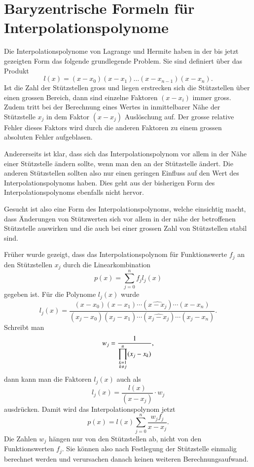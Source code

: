%
%
%
\section{Baryzentrische Formeln für Interpolationspolynome
\label{buch:section:baryzentrisch}}
Die Interpolationspolynome von Lagrange und Hermite haben 
in der bis jetzt gezeigten Form das folgende grundlegende Problem.
Sie sind definiert über das Produkt
\[
l(x)
=
(x-x_0)(x-x_1)\dots (x-x_{n-1})(x-x_n).
\]
Ist die Zahl der Stützstellen gross und liegen erstrecken sich die 
Stützstellen über einen grossen Bereich, dann sind einzelne Faktoren
$(x-x_i)$ immer gross.
Zudem tritt bei der Berechnung eines Wertes in inmittelbarer 
Nähe der Stützstelle $x_j$ in dem Faktor $(x-x_j)$ Auslöschung auf.
Der grosse relative Fehler dieses Faktors wird durch die anderen Faktoren
zu einem grossen absoluten Fehler aufgeblasen.

Andererseits ist klar, dass sich das Interpolationspolynom vor allem
in der Nähe einer Stützstelle ändern sollte, wenn man den an der
Stützstelle ändert.
Die anderen Stützstellen sollten also nur einen geringen Einfluss auf
den Wert des Interpolationspolynoms haben.
Dies geht aus der bisherigen Form des Interpolationspolynoms ebenfalls
nicht hervor.

Gesucht ist also eine Form des Interpolationspolynoms, welche einsichtig
macht, dass Änderungen von Stützwerten sich vor allem in der nähe der
betroffenen Stützstelle auswirken und die auch bei einer grossen Zahl
von Stützstellen stabil sind.

Früher wurde gezeigt, dass das Interpolationspolynom für Funktionswerte
$f_j$ an den Stützstellen $x_j$ durch die Linearkombination
\[
p(x) = \sum_{j=0}^n f_j l_j(x)
\]
gegeben ist.
Für die Polynome $l_j(x)$ wurde
\[
l_j(x)
=
\frac{
(x-x_0)(x-x_1)\cdots(\widehat{x-x_j}) \cdots (x-x_n)
}{
(x_j-x_0)(x_j-x_1)\cdots (\widehat{x_j-x_j})\cdots (x_j-x_n)
}.
\]
Schreibt man
\[
w_j
=
\frac{1}{
\displaystyle\prod_{\scriptstyle k=1\atop \scriptstyle k\ne j}^n (x_j-x_k)
},
\]
dann kann man die Faktoren $l_j(x)$ auch als
\[
l_j(x)
=
\frac{l(x)}{(x-x_j)}\cdot w_j
\]
ausdrücken.
Damit wird das Interpolationspolynom jetzt
\begin{equation}
p(x)
=
l(x) \sum_{j=0}^n \frac{w_jf_j}{x-x_j}.
\label{buch:bary:px}
\end{equation}
Die Zahlen $w_j$ hängen nur von den Stützstellen ab, nicht von den
Funktionswerten $f_j$. 
Sie können also nach Festlegung der Stützstelle einmalig berechnet
werden und verursachen danach keinen weiteren Berechnungsaufwand.

